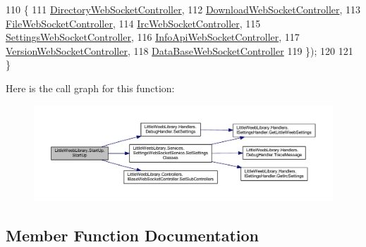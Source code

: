 \begin{DoxyCode}
110             \{
111                 \mbox{\hyperlink{class_little_weeb_library_1_1_start_up_a7d9287cfe0c87dd727af3e0932905870}{DirectoryWebSocketController}},
112                 \mbox{\hyperlink{class_little_weeb_library_1_1_start_up_ad5421fcdf8aae805b8331bd0e9034f39}{DownloadWebSocketController}},
113                 \mbox{\hyperlink{class_little_weeb_library_1_1_start_up_a98e8d01c4660f0288eb114f2a11c8d4d}{FileWebSocketController}},
114                 \mbox{\hyperlink{class_little_weeb_library_1_1_start_up_a47d1759095fa3e41fccb1a6d6997a91c}{IrcWebSocketController}},
115                 \mbox{\hyperlink{class_little_weeb_library_1_1_start_up_a2c80109780ba0dc7597ad400327dc25f}{SettingsWebSocketController}},
116                 \mbox{\hyperlink{class_little_weeb_library_1_1_start_up_a85ff0dfe3a4216d8ebdc822744566cb3}{InfoApiWebSocketController}},
117                 \mbox{\hyperlink{class_little_weeb_library_1_1_start_up_a7f740efb00da5359c15ecb26a05fd528}{VersionWebSocketController}},
118                 \mbox{\hyperlink{class_little_weeb_library_1_1_controllers_1_1_sub_controllers_1_1_data_base_web_socket_controller}{DataBaseWebSocketController}}
119             \});
120 
121         \}
\end{DoxyCode}
Here is the call graph for this function\+:\nopagebreak
\begin{figure}[H]
\begin{center}
\leavevmode
\includegraphics[width=350pt]{class_little_weeb_library_1_1_start_up_a7f35b9dfb45fb003a9653d1f531044c9_cgraph}
\end{center}
\end{figure}


\subsection{Member Function Documentation}
\mbox{\label{class_little_weeb_library_1_1_start_up_a2ea98092dfdb92bfc6decfdc373d6e78}} 
